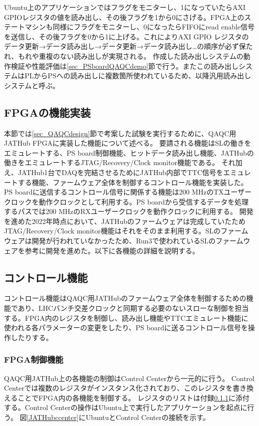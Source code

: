 Ubuntu上のアプリケーションではフラグをモニターし、1になっていたらAXI GPIOレジスタの値を読み出し、その後フラグを1から0にさげる。FPGA上のステートマシンも同様にフラグをモニターし、0になったらFIFOにread enable信号を送信し、その後フラグを0から1に上げる。これによりAXI GPIO レジスタのデータ更新→データ読み出し→データ更新→データ読み出し…の順序が必ず保たれ、もれや重複のない読み出しが実現される。
作成した読み出しシステムの動作検証や性能評価は\ref{sec_PSboardQAQCdemo}節で行う。またこの読み出しシステムはPLからPSへの読み出しに複数箇所使われているため、以降汎用読み出しシステムと呼ぶ。


\subsection{FPGAの機能実装}
\label{subsec_function}
本節では\ref{sec_QAQCdesign}節で考案した試験を実行するために、QAQC用JATHub FPGAに実装した機能について述べる。
要請される機能はSLの働きをエミュレートする、PS board制御機能、ヒットデータ読み出し機能、JATHubの働きをエミュレートするJTAG/Recovery/Clock monitor機能である。
それ加え、JATHub1台でDAQを完結させるためにJATHub内部でTTC信号をエミュレートする機能、ファームウェア全体を制御するコントロール機能を実装した。
PS boardに送信するコントロール信号に関係する機能は200 MHzのTXユーザークロックを動作クロックとして利用する。PS boardから受信するデータを処理するパスでは200 MHzのRXユーザークロックを動作クロックに利用する。
開発を進めた2022年時点において、JATHubのファームウェアは完成していたためJTAG/Recovery/Clock monitor機能はそれをそのまま利用する。SLのファームウェアは開発が行われていなかったため、Run3で使われているSLのファームウェアを参考に開発を進めた。以下に各機能の詳細を説明する。

\subsection*{\textbf{コントロール機能}}
\label{subsubsec_control}
コントロール機能はQAQC用JATHubのファームウェア全体を制御するための機能であり、LHCバンチ交差クロックと同期する必要のないスローな制御を担当する。FPGA内のレジスタを制御し、読み出し機能やTTCエミュレート機能に使われる各パラメーターの変更をしたり、PS boardに送るコントロール信号を操作したりする。

\subsubsection{FPGA制御機能}
QAQC用JATHub上の各機能の制御はControl Centerから一元的に行う。
Control Centerでは複数のレジスタがインスタンス化されており、このレジスタを書き換えることでFPGA内の各機能を制御する。
レジスタのリストは付録\ref{}に添付する。Control Centerの操作はUbuntu上で実行したアプリケーションを起点に行う。
図\ref{JATHubccenter}にUbuntuとControl Centerの接続を示す。


